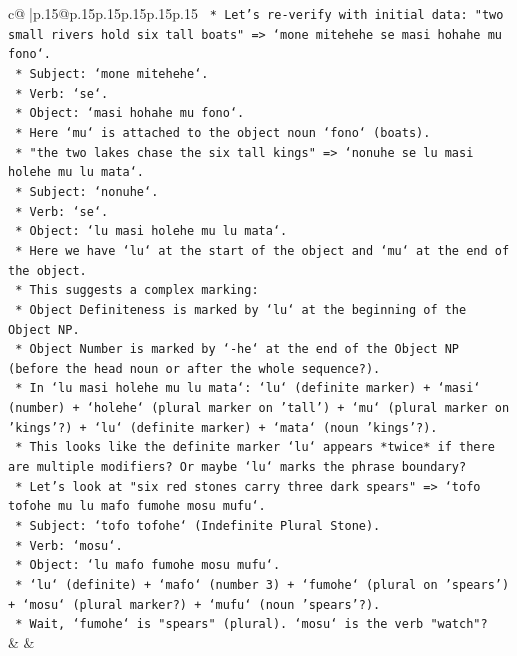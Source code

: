 \documentclass{article}
\begin{document}
{\begin{supertabular}{c@{$\;$}|p{.15\linewidth}@{}p{.15\linewidth}p{.15\linewidth}p{.15\linewidth}p{.15\linewidth}p{.15\linewidth}}
{{{\texttt{        *   Let's re{-}verify with initial data: "two small rivers hold six tall boats" => `mone mitehehe se masi hohahe mu fono`.} \\
\texttt{            *   Subject: `mone mitehehe`.} \\
\texttt{            *   Verb: `se`.} \\
\texttt{            *   Object: `masi hohahe mu fono`.} \\
\texttt{            *   Here `mu` is attached to the object noun `fono` (boats).} \\
\texttt{        *   "the two lakes chase the six tall kings" => `nonuhe se lu masi holehe mu lu mata`.} \\
\texttt{            *   Subject: `nonuhe`.} \\
\texttt{            *   Verb: `se`.} \\
\texttt{            *   Object: `lu masi holehe mu lu mata`.} \\
\texttt{            *   Here we have `lu` at the start of the object and `mu` at the end of the object.} \\
\texttt{        *   This suggests a complex marking:} \\
\texttt{            *   Object Definiteness is marked by `lu` at the beginning of the Object NP.} \\
\texttt{            *   Object Number is marked by `{-}he` at the end of the Object NP (before the head noun or after the whole sequence?).} \\
\texttt{            *   In `lu masi holehe mu lu mata`: `lu` (definite marker) + `masi` (number) + `holehe` (plural marker on 'tall') + `mu` (plural marker on 'kings'?) + `lu` (definite marker) + `mata` (noun 'kings'?).} \\
\texttt{            *   This looks like the definite marker `lu` appears *twice* if there are multiple modifiers? Or maybe `lu` marks the phrase boundary?} \\
\texttt{            *   Let's look at "six red stones carry three dark spears" => `tofo tofohe mu lu mafo fumohe mosu mufu`.} \\
\texttt{            *   Subject: `tofo tofohe` (Indefinite Plural Stone).} \\
\texttt{            *   Verb: `mosu`.} \\
\texttt{            *   Object: `lu mafo fumohe mosu mufu`.} \\
\texttt{            *   `lu` (definite) + `mafo` (number 3) + `fumohe` (plural on 'spears') + `mosu` (plural marker?) + `mufu` (noun 'spears'?).} \\
\texttt{            *   Wait, `fumohe` is "spears" (plural). `mosu` is the verb "watch"?} \\
            }
        }
    }
    & & \\ \\


\end{supertabular}}
\end{document}
